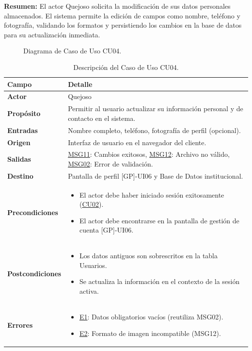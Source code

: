 \begin{appendices}
\textbf{Resumen:} 
El actor Quejoso solicita la modificación de sus datos personales almacenados. El sistema permite la edición de campos como nombre, teléfono y fotografía, validando los formatos y persistiendo los cambios en la base de datos para su actualización inmediata.

\begin{figure}[htbp]
    \centering
    \figCUcuatro
    \caption{Diagrama de Caso de Uso CU04.}
    \label{fig:cu04}
\end{figure}

\begin{table}[htbp]
\centering
\small
\begin{tabular}{|p{3.5cm}|p{10.5cm}|}
\hline
\rowcolor[HTML]{EFEFEF} 
\textbf{Campo} & \textbf{Detalle} \\ \hline
\textbf{Actor} & Quejoso \\ \hline
\textbf{Propósito} & Permitir al usuario actualizar su información personal y de contacto en el sistema. \\ \hline
\textbf{Entradas} & Nombre completo, teléfono, fotografía de perfil (opcional). \\ \hline
\textbf{Origen} & Interfaz de usuario en el navegador del cliente. \\ \hline
\textbf{Salidas} & \hyperlink{msg:MSG11}{MSG11}: Cambios exitosos, \hyperlink{msg:MSG12}{MSG12}: Archivo no válido, \hyperlink{msg:MSG02}{MSG02}: Error de validación. \\ \hline
\textbf{Destino} & Pantalla de perfil [GP]-UI06 y Base de Datos institucional. \\ \hline
\textbf{Precondiciones} & 
\begin{itemize}[nosep, leftmargin=*]
    \item El actor debe haber iniciado sesión exitosamente (\hyperlink{anexo:casos_uso}{CU02}).
    \item El actor debe encontrarse en la pantalla de gestión de cuenta [GP]-UI06.
\end{itemize} \\ \hline
\textbf{Postcondiciones} & 
\begin{itemize}[nosep, leftmargin=*]
    \item Los datos antiguos son sobrescritos en la tabla Usuarios.
    \item Se actualiza la información en el contexto de la sesión activa.
\end{itemize} \\ \hline
\textbf{Errores} & 
\begin{itemize}[nosep, leftmargin=*]
    \item \hyperlink{msg:MSG02}{E1}: Datos obligatorios vacíos (reutiliza MSG02).
    \item \hyperlink{err:E7}{E2}: Formato de imagen incompatible (MSG12).
\end{itemize} \\ \hline
\end{tabular}
\caption{Descripción del Caso de Uso CU04.}
\label{tab:cu04_especificacion}
\end{table}


\end{appendices}
